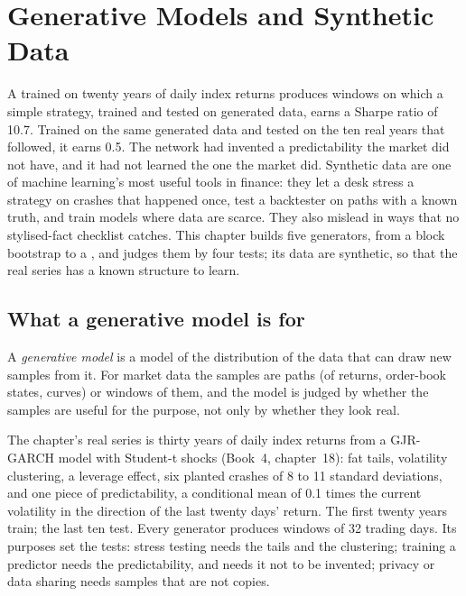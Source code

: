 \chapter{Generative Models and Synthetic Data}\label{ch:ml:generative-models-and-synthetic-data}

A  trained on twenty years of daily index returns produces windows on which a simple
strategy, trained and tested on generated data, earns a Sharpe ratio of 10.7. Trained on the same generated data and
tested on the ten real years that followed, it earns 0.5. The network had invented a predictability the market did not
have, and it had not learned the one the market did. Synthetic data are one of machine learning's most useful tools in
finance: they let a desk stress a strategy on crashes that happened once, test a backtester on paths with a known truth,
and train models where data are scarce. They also mislead in ways that no stylised-fact checklist catches. This chapter
builds five generators, from a block bootstrap to a , and judges them by four tests; its data are
synthetic, so that the real series has a known structure to learn.

\section{What a generative model is for}

\begin{definition}\label{def:ml:generative-models-and-synthetic-data:gen}
A \emph{generative model} is a model of the distribution of the data that can draw new samples from
it. For market data the samples are paths (of returns, order-book states, curves) or windows of them, and the model is judged
by whether the samples are useful for the purpose, not only by whether they look real.
\end{definition}

The chapter's real series is thirty years of daily index returns from a GJR-GARCH model with Student-t shocks (Book~4,
chapter~18): fat tails, volatility clustering, a leverage effect, six planted crashes of 8 to 11 standard deviations, and
one piece of predictability, a conditional mean of 0.1 times the current volatility in the direction of the last twenty
days' return. The first twenty years train; the last ten test. Every generator produces windows of 32 trading days. Its
purposes set the tests: stress testing needs the tails and the clustering; training a predictor needs the predictability,
and needs it not to be invented; privacy or data sharing needs samples that are not copies.


